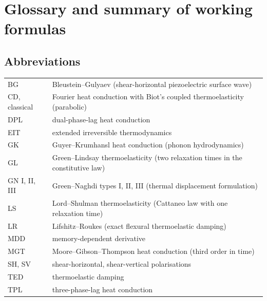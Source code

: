 \section{Glossary and summary of working formulas}\label{app:glossary}

\subsection{Abbreviations}
\begin{center}\small
\begin{tabular}{@{}p{2.4cm}p{12cm}@{}}\toprule
BG & Bleustein--Gulyaev (shear-horizontal piezoelectric surface wave)\\
CD, classical & Fourier heat conduction with Biot's coupled thermoelasticity (parabolic)\\
DPL & dual-phase-lag heat conduction\\
EIT & extended irreversible thermodynamics\\
GK & Guyer--Krumhansl heat conduction (phonon hydrodynamics)\\
GL & Green--Lindsay thermoelasticity (two relaxation times in the constitutive law)\\
GN I, II, III & Green--Naghdi types I, II, III (thermal displacement formulation)\\
LS & Lord--Shulman thermoelasticity (Cattaneo law with one relaxation time)\\
LR & Lifshitz--Roukes (exact flexural thermoelastic damping)\\
MDD & memory-dependent derivative\\
MGT & Moore--Gibson--Thompson heat conduction (third order in time)\\
SH, SV & shear-horizontal, shear-vertical polarisations\\
TED & thermoelastic damping\\
TPL & three-phase-lag heat conduction\\
\bottomrule\end{tabular}
\end{center}

